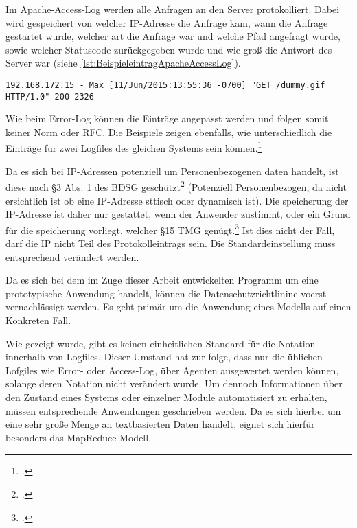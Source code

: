 Im Apache-Access-Log werden alle Anfragen an den Server protokolliert. Dabei wird gespeichert von welcher \ac{IP}-Adresse die Anfrage kam, wann die Anfrage gestartet wurde, welcher art die Anfrage war und welche Pfad angefragt wurde, sowie welcher Statuscode zurückgegeben wurde und wie groß die Antwort des Server war (siehe \autoref{lst:BeispieleintragApacheAccessLog}). \\

\begin{lstlisting}[caption=Beispieleintrag für ein Appache-Access-Log,label=lst:BeispieleintragApacheAccessLog]
192.168.172.15 - Max [11/Jun/2015:13:55:36 -0700] "GET /dummy.gif HTTP/1.0" 200 2326
\end{lstlisting}

Wie beim Error-Log können die Einträge angepasst werden und folgen somit keiner Norm oder \ac{RFC}. Die Beispiele zeigen ebenfalls, wie unterschiedlich die Einträge für zwei Logfiles des gleichen Systems sein können.\footcite[Vgl.][]{ApacheAccessLog.2015}

Da es sich bei \ac{IP}-Adressen potenziell um Personenbezogenen daten handelt, ist diese nach §3 Abs. 1 des \ac{BDSG} geschützt\footcite[§3 Abs. 1 BDSG,][]{BDSG3.1990} (Potenziell Personenbezogen, da nicht ersichtlich ist ob eine \ac{IP}-Adresse sttisch oder dynamisch ist). Die speicherung der \ac{IP}-Adresse ist daher nur gestattet, wenn der Anwender zustimmt, oder ein Grund für die speicherung vorliegt, welcher §15 \ac{TMG} genügt.\footcite[§15 TMG,][]{TMG15.2007} Ist dies nicht der Fall, darf die \ac{IP} nicht Teil des Protokolleintrags sein. Die Standardeinstellung muss entsprechend verändert werden.

Da es sich bei dem im Zuge dieser Arbeit entwickelten Programm um eine prototypische Anwendung handelt, können die Datenschutzrichtlinine voerst vernachlässigt werden. Es geht primär um die Anwendung eines Modells auf einen Konkreten Fall.

Wie gezeigt wurde, gibt es keinen einheitlichen Standard für die Notation innerhalb von Logfiles. Dieser Umstand hat zur folge, dass nur die üblichen Lofgiles wie Error- oder Access-Log, über Agenten ausgewertet werden können, solange deren Notation nicht verändert wurde. Um dennoch Informationen über den Zustand eines Systems oder einzelner Module automatisiert zu erhalten, müssen entsprechende Anwendungen geschrieben werden. Da es sich hierbei um eine sehr große Menge an textbasierten Daten handelt, eignet sich hierfür besonders das MapReduce-Modell.

